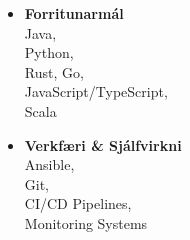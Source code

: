 \documentclass[a4paper,10pt]{article}
\begin{document}
\begin{multicols}{3}
\begin{itemize}[nosep, leftmargin=*]
		\item \textbf{Forritunarmál}\\
		      Java,\\
		      Python,\\
		      Rust, Go,\\
		      JavaScript/TypeScript,\\
		      Scala

		\item \textbf{Verkfæri \& Sjálfvirkni}\\
		      Ansible,\\
		      Git,\\
		      CI/CD Pipelines,\\
		      Monitoring Systems

	\end{itemize}
\end{multicols}
\end{document}
